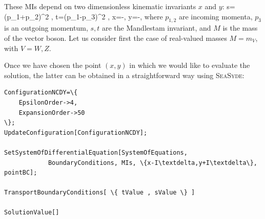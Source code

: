 These MIs depend on two dimensionless kinematic invariants
$x$ and $y$:
\be
    s=(p_1+p_2)^2 \;,\qquad
    t=(p_1-p_3)^2 \;,\qquad
    x=-\;,\qquad
    y=-\;,
    \label{eq:kinVariablesReal}
\ee
where $p_{1,2}$ are incoming momenta, $p_3$ is an outgoing momentum, $s,t$ are the Mandlestam invariant, and
$M$ is the mass of the vector boson.
Let us consider first the case of real-valued masses $M=m_V$, with $V=W,Z$.

Once we have chosen the point $(x,y)$
in which we would like to evaluate the solution, the latter can be obtained in a straightforward way
using \textsc{SeaSyde}:
\begin{Verbatim}[commandchars=\\\{\}] 
ConfigurationNCDY=\{                               
	EpsilonOrder->4,                               
	ExpansionOrder->50                                 
\};                                                      
UpdateConfiguration[ConfigurationNCDY];

SetSystemOfDifferentialEquation[SystemOfEquations, 
	        BoundaryConditions, MIs, \{x-I\textdelta,y+I\textdelta\}, pointBC]; 

TransportBoundaryConditions[ \{ tValue , sValue \} ]

SolutionValue[]
\end{Verbatim}

